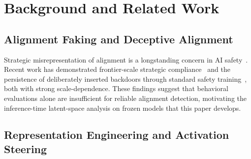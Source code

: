 \section{Background and Related Work}

\subsection{Alignment Faking and Deceptive Alignment}

Strategic misrepresentation of alignment is a longstanding concern in AI safety~\citep{hubinger2024sleeper, greenblatt2024alignment}. Recent work has demonstrated frontier-scale strategic compliance~\citep{greenblatt2024alignment} and the persistence of deliberately inserted backdoors through standard safety training~\citep{hubinger2024sleeper}, both with strong scale-dependence. These findings suggest that behavioral evaluations alone are insufficient for reliable alignment detection, motivating the inference-time latent-space analysis on frozen models that this paper develops.

\subsection{Representation Engineering and Activation Steering}

